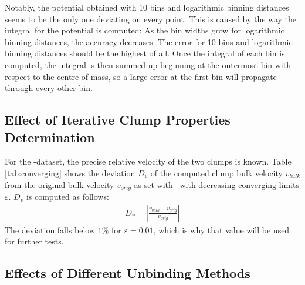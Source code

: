 Notably, the potential obtained with 10 bins and logarithmic binning distances seems to be the only one deviating on every point.
This is caused by the way the integral for the potential is computed:
As the bin widths grow for logarithmic binning distances, the accuracy decreases.
The error for 10 bins and logarithmic binning distances should be the highest of all.
Once the integral of each bin is computed, the integral is then summed up beginning at the outermost bin with respect to the centre of mass, so a large error at the first bin will propagate through every other bin. 





















\subsection{Effect of Iterative Clump Properties Determination}\label{chap:iter}



For the \dt-dataset, the precise relative velocity of the two clumps is known.
Table \ref{tab:converging} shows the deviation $D_v$ of the computed clump bulk velocity $v_{bulk}$ from the original bulk velocity $v_{orig}$ as set with \dice\ with decreasing converging limits $\varepsilon$.
$D_v$ is computed as follows:
%
\begin{align}
	D_v = \left | 	 \frac{v_{bulk} - v_{orig}}{v_{orig}}				\right | \label{eq:Dv}
\end{align} 
%
The deviation falls below $1\%$ for $\varepsilon = 0.01$, which is why that value will be used for further tests.






















\subsection{Effects of Different Unbinding Methods}\label{chap:unbindings}

